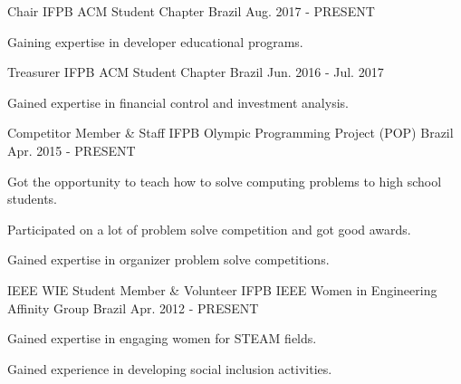

\begin{cventries}

  \cventry
    {Chair} %
    {IFPB ACM Student Chapter} %
    {Brazil} %
    {Aug. 2017 - PRESENT} %
    {
      \begin{cvitems} %
        \item {Gaining expertise in developer educational programs.}
      \end{cvitems}
    }
    
  \cventry
    {Treasurer} %
    {IFPB ACM Student Chapter} %
    {Brazil} %
    {Jun. 2016 - Jul. 2017} %
    {
      \begin{cvitems} %
        \item {Gained expertise in financial control and investment analysis.}
      \end{cvitems}
    }
    
  \cventry
    {Competitor Member \& Staff} %
    {IFPB Olympic Programming Project (POP)} %
    {Brazil} %
    {Apr. 2015 - PRESENT} %
    {
      \begin{cvitems} %
        \item {Got the opportunity to teach how to solve computing problems to high school students.}
        \item {Participated on a lot of problem solve competition and got good awards.}
        \item {Gained expertise in organizer problem solve competitions.}
      \end{cvitems}
    }

  \cventry
    {IEEE WIE Student Member \& Volunteer} %
    {IFPB IEEE Women in Engineering Affinity Group} %
    {Brazil} %
    {Apr. 2012 - PRESENT} %
    {
      \begin{cvitems} %
        \item {Gained expertise in engaging women for STEAM fields.}
        \item {Gained experience in developing social inclusion activities.}
      \end{cvitems}
    }


\end{cventries}
